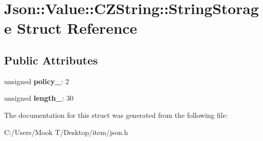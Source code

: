\hypertarget{struct_json_1_1_value_1_1_c_z_string_1_1_string_storage}{}\section{Json\+:\+:Value\+:\+:C\+Z\+String\+:\+:String\+Storage Struct Reference}
\label{struct_json_1_1_value_1_1_c_z_string_1_1_string_storage}
\subsection*{Public Attributes}
\begin{DoxyCompactItemize}
\item 
\hypertarget{struct_json_1_1_value_1_1_c_z_string_1_1_string_storage_a7f68c8d6197c5692a525854b5f29f87b}{}unsigned {\bfseries policy\+\_\+}\+: 2\label{struct_json_1_1_value_1_1_c_z_string_1_1_string_storage_a7f68c8d6197c5692a525854b5f29f87b}

\item 
\hypertarget{struct_json_1_1_value_1_1_c_z_string_1_1_string_storage_a165d865c44e6471d34668eeb4f15b140}{}unsigned {\bfseries length\+\_\+}\+: 30\label{struct_json_1_1_value_1_1_c_z_string_1_1_string_storage_a165d865c44e6471d34668eeb4f15b140}

\end{DoxyCompactItemize}


The documentation for this struct was generated from the following file\+:\begin{DoxyCompactItemize}
\item 
C\+:/\+Users/\+Mook T/\+Desktop/item/json.\+h\end{DoxyCompactItemize}
